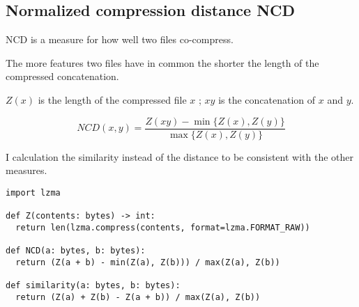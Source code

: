 \documentclass[../main.tex]{subfiles}
\begin{document}
\subsection{Normalized compression distance NCD}

NCD is a measure for how well two files co-compress.

The more features two files have in common the shorter the length of the compressed concatenation.

$Z(x)$ is the length of the compressed file $x$ ; $xy$ is the concatenation of $x$ and $y$.

\begin{equation}
  NCD(x,y) = \dfrac{Z(xy) - \min \{Z(x),Z(y)\}}{\max \{Z(x),Z(y)\}}
\end{equation}

I calculation the similarity instead of the distance to be consistent with the other measures.

\begin{lstlisting}[style=pymd]
import lzma

def Z(contents: bytes) -> int:
  return len(lzma.compress(contents, format=lzma.FORMAT_RAW))

def NCD(a: bytes, b: bytes):
  return (Z(a + b) - min(Z(a), Z(b))) / max(Z(a), Z(b))

def similarity(a: bytes, b: bytes):
  return (Z(a) + Z(b) - Z(a + b)) / max(Z(a), Z(b))
\end{lstlisting}
\end{document}
